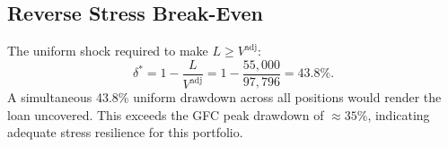 \documentclass[12pt, a4paper]{article}
\newcommand{\1}{\mathbbm{1}}
\begin{document}
\subsection*{Reverse Stress Break-Even}
The uniform shock required to make $L \geq V^{\mathrm{adj}}$:
\[
\delta^* = 1 - \frac{L}{V^{\mathrm{adj}}} = 1 - \frac{55{,}000}{97{,}796} = 43.8\%.
\]
A simultaneous 43.8\% uniform drawdown across all positions would render the
loan uncovered. This exceeds the GFC peak drawdown of $\approx 35\%$, indicating
adequate stress resilience for this portfolio.
\end{document}

